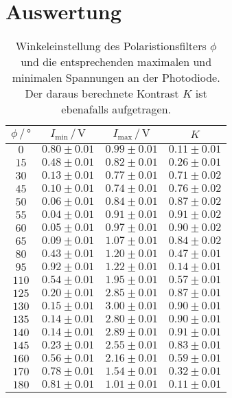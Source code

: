\section{Auswertung}
\label{sec:Auswertung}


\begin{table}
    \centering
    \caption{Winkeleinstellung des Polaristionsfilters $\phi$ und die entsprechenden maximalen und minimalen Spannungen an der Photodiode. Der daraus berechnete Kontrast $K$ ist ebenafalls aufgetragen.}
    \label{tab:kontrast}
    \begin{tabular}{c c c c}
        \toprule
        $\phi \,/\, \unit{\degree}$ & $I_\text{min} \,/\, \unit{\volt}$ & $I_\text{max} \,/\, \unit{\volt}$ & $K$ \\
        \midrule
        $0  $ &   $ 0.80\pm 0.01$ & $ 	0.99 \pm 0.01$ &  $ 0.11 \pm 0.01 $ \\
        $15	$ &   $ 0.48\pm 0.01$ & $	0.82 \pm 0.01$ &  $ 0.26 \pm 0.01 $ \\
        $30	$ &   $ 0.13\pm 0.01$ & $	0.77 \pm 0.01$ &  $ 0.71 \pm 0.02 $ \\
        $45	$ &   $ 0.10\pm 0.01$ & $	0.74 \pm 0.01$ &  $ 0.76 \pm 0.02 $ \\
        $50	$ &   $ 0.06\pm 0.01$ & $	0.84 \pm 0.01$ &  $ 0.87 \pm 0.02 $ \\
        $55	$ &   $ 0.04\pm 0.01$ & $	0.91 \pm 0.01$ &  $ 0.91 \pm 0.02 $ \\
        $60	$ &   $ 0.05\pm 0.01$ & $	0.97 \pm 0.01$ &  $ 0.90 \pm 0.02 $ \\
        $65	$ &   $ 0.09\pm 0.01$ & $	1.07 \pm 0.01$ &  $ 0.84 \pm 0.02 $ \\
        $80	$ &   $ 0.43\pm 0.01$ & $	1.20 \pm 0.01$ &  $ 0.47 \pm 0.01 $ \\
        $95	$ &   $ 0.92\pm 0.01$ & $	1.22 \pm 0.01$ &  $ 0.14 \pm 0.01 $ \\
        $110$ &   $ 0.54\pm 0.01$ & $  	1.95 \pm 0.01$ &  $ 0.57 \pm 0.01 $ \\
        $125$ &   $ 0.20\pm 0.01$ & $  	2.85 \pm 0.01$ &  $ 0.87 \pm 0.01 $ \\
        $130$ &   $ 0.15\pm 0.01$ & $  	3.00 \pm 0.01$ &  $ 0.90 \pm 0.01 $ \\
        $135$ &   $ 0.14\pm 0.01$ & $  	2.80 \pm 0.01$ &  $ 0.90 \pm 0.01 $ \\
        $140$ &   $ 0.14\pm 0.01$ & $  	2.89 \pm 0.01$ &  $ 0.91 \pm 0.01 $ \\
        $145$ &   $ 0.23\pm 0.01$ & $  	2.55 \pm 0.01$ &  $ 0.83 \pm 0.01 $ \\
        $160$ &   $ 0.56\pm 0.01$ & $  	2.16 \pm 0.01$ &  $ 0.59 \pm 0.01 $ \\
        $170$ &   $ 0.78\pm 0.01$ & $  	1.54 \pm 0.01$ &  $ 0.32 \pm 0.01 $ \\
        $180$ &   $ 0.81\pm 0.01$ & $  	1.01 \pm 0.01$ &  $ 0.11 \pm 0.01 $ \\
        \bottomrule
    \end{tabular}
\end{table}



